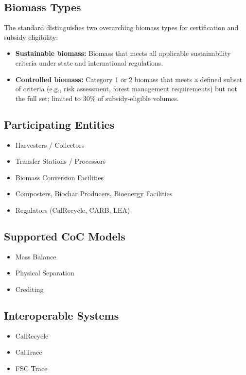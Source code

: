 \documentclass{article}
\begin{document}
\subsection*{Biomass Types}
The standard distinguishes two overarching biomass types for certification and subsidy eligibility:
\begin{itemize}[noitemsep]
    \item \textbf{Sustainable biomass:} Biomass that meets all applicable sustainability criteria under state and international regulations.
    \item \textbf{Controlled biomass:} Category 1 or 2 biomass that meets a defined subset of criteria (e.g., risk assessment, forest management requirements) but not the full set; limited to 30\% of subsidy-eligible volumes.
\end{itemize}

\subsection*{Participating Entities}
\begin{itemize}[noitemsep]
    \item Harvesters / Collectors
    \item Transfer Stations / Processors
    \item Biomass Conversion Facilities
    \item Composters, Biochar Producers, Bioenergy Facilities
    \item Regulators (CalRecycle, CARB, LEA)
\end{itemize}

\subsection*{Supported CoC Models}
\begin{itemize}[noitemsep]
    \item Mass Balance
    \item Physical Separation
    \item Crediting
\end{itemize}

\subsection*{Interoperable Systems}
\begin{itemize}[noitemsep]
    \item CalRecycle
    \item CalTrace
    \item FSC Trace
\end{itemize}
\end{document}

